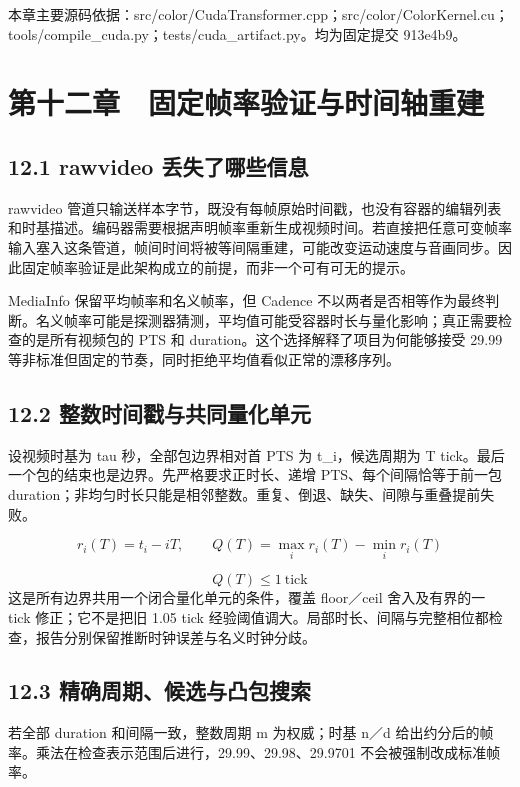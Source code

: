 \documentclass[UTF8,zihao=-4,openany]{ctexbook}
\begin{document}
\par\small 本章主要源码依据：src/color/CudaTransformer.cpp；src/color/ColorKernel.cu；tools/compile\_cuda.py；tests/cuda\_artifact.py。均为固定提交 913e4b9。\normalsize

\chapter*{第十二章　固定帧率验证与时间轴重建}

\section*{12.1 rawvideo 丢失了哪些信息}
rawvideo 管道只输送样本字节，既没有每帧原始时间戳，也没有容器的编辑列表和时基描述。编码器需要根据声明帧率重新生成视频时间。若直接把任意可变帧率输入塞入这条管道，帧间时间将被等间隔重建，可能改变运动速度与音画同步。因此固定帧率验证是此架构成立的前提，而非一个可有可无的提示。

MediaInfo 保留平均帧率和名义帧率，但 Cadence 不以两者是否相等作为最终判断。名义帧率可能是探测器猜测，平均值可能受容器时长与量化影响；真正需要检查的是所有视频包的 PTS 和 duration。这个选择解释了项目为何能够接受 29.99 等非标准但固定的节奏，同时拒绝平均值看似正常的漂移序列。


\section*{12.2 整数时间戳与共同量化单元}
设视频时基为 tau 秒，全部包边界相对首 PTS 为 t\_i，候选周期为 T tick。最后一个包的结束也是边界。先严格要求正时长、递增 PTS、每个间隔恰等于前一包 duration；非均匀时长只能是相邻整数。重复、倒退、缺失、间隙与重叠提前失败。


\begin{equation}
r_i(T)=t_i-iT,\qquad Q(T)=\max_i r_i(T)-\min_i r_i(T)
\end{equation}

\begin{equation}
Q(T)\leq 1\ \mathrm{tick}
\end{equation}
这是所有边界共用一个闭合量化单元的条件，覆盖 floor／ceil 舍入及有界的一 tick 修正；它不是把旧 1.05 tick 经验阈值调大。局部时长、间隔与完整相位都检查，报告分别保留推断时钟误差与名义时钟分歧。


\section*{12.3 精确周期、候选与凸包搜索}
若全部 duration 和间隔一致，整数周期 m 为权威；时基 n／d 给出约分后的帧率。乘法在检查表示范围后进行，29.99、29.98、29.9701 不会被强制改成标准帧率。
\end{document}
